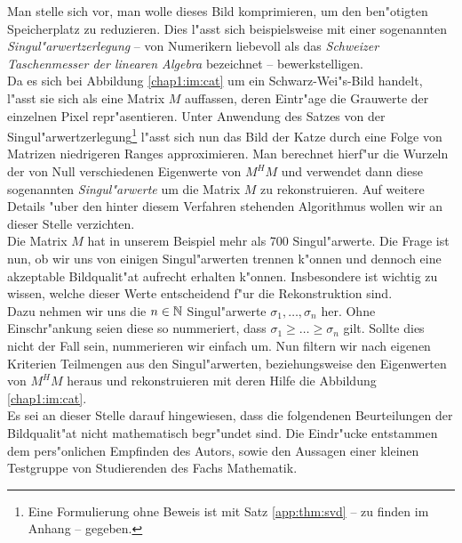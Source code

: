 Man stelle sich vor, man wolle dieses Bild komprimieren, um den ben"otigten Speicherplatz zu reduzieren.
Dies l"asst sich beispielsweise mit einer sogenannten \emph{Singul"arwertzerlegung} -- von Numerikern liebevoll als das \emph{Schweizer Taschenmesser der linearen Algebra} bezeichnet -- bewerkstelligen.\\

Da es sich bei Abbildung \ref{chap1:im:cat} um ein Schwarz-Wei"s-Bild handelt, l"asst sie sich als eine Matrix $M$ auffassen, deren Eintr"age die Grauwerte der einzelnen Pixel repr"asentieren.
Unter Anwendung des Satzes von der Singul"arwertzerlegung\footnote{Eine Formulierung ohne Beweis ist mit Satz \ref{app:thm:svd} -- zu finden im Anhang -- gegeben.} l"asst sich nun das Bild der Katze durch eine Folge von Matrizen niedrigeren Ranges approximieren.
Man berechnet hierf"ur die Wurzeln der von Null verschiedenen Eigenwerte von $M^H M$ und verwendet dann diese sogenannten \emph{Singul"arwerte} um die Matrix $M$ zu rekonstruieren.
Auf weitere Details "uber den hinter diesem Verfahren stehenden Algorithmus wollen wir an dieser Stelle verzichten.\\

Die Matrix $M$ hat in unserem Beispiel mehr als 700 Singul"arwerte. Die Frage ist nun, ob wir uns von einigen Singul"arwerten trennen k"onnen und dennoch eine akzeptable Bildqualit"at aufrecht erhalten k"onnen.
Insbesondere ist wichtig zu wissen, welche dieser Werte entscheidend f"ur die Rekonstruktion sind.\\

Dazu nehmen wir uns die $n\in\mathbb{N}$ Singul"arwerte $\sigma_1,\ldots,\sigma_n$ her. Ohne Einschr"ankung seien diese so nummeriert, dass $\sigma_1 \ge \ldots \ge \sigma_n$ gilt. Sollte dies nicht der Fall sein, nummerieren wir einfach um.
Nun filtern wir nach eigenen Kriterien Teilmengen aus den Singul"arwerten, beziehungsweise den Eigenwerten von $M^H M$ heraus und rekonstruieren mit deren Hilfe die Abbildung \ref{chap1:im:cat}.\\

Es sei an dieser Stelle darauf hingewiesen, dass die folgendenen Beurteilungen der Bildqualit"at nicht mathematisch begr"undet sind.
Die Eindr"ucke entstammen dem pers"onlichen Empfinden des Autors, sowie den Aussagen einer kleinen Testgruppe von Studierenden des Fachs Mathematik.\\

